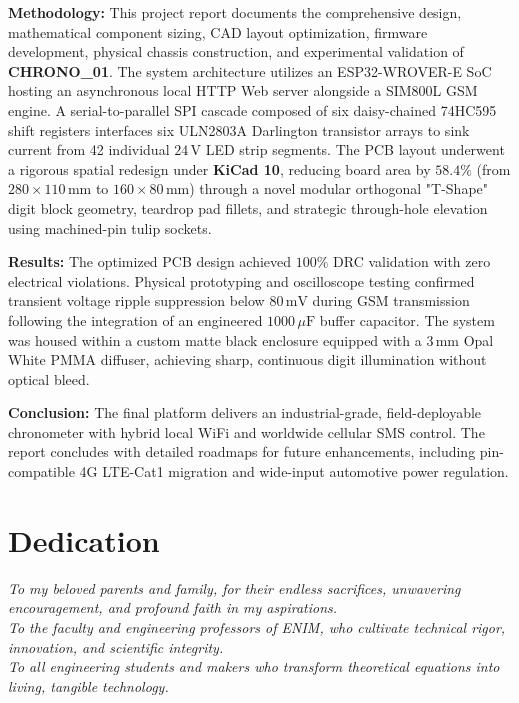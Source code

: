 \documentclass[12pt,a4paper,oneside]{report}
\begin{document}
\vspace{0.4cm}
\noindent\textbf{Methodology:} This project report documents the comprehensive design, mathematical component sizing, CAD layout optimization, firmware development, physical chassis construction, and experimental validation of \textbf{CHRONO\_01}. The system architecture utilizes an ESP32-WROVER-E SoC hosting an asynchronous local HTTP Web server alongside a SIM800L GSM engine. A serial-to-parallel SPI cascade composed of six daisy-chained 74HC595 shift registers interfaces six ULN2803A Darlington transistor arrays to sink current from 42 individual $24\,\text{V}$ LED strip segments. The PCB layout underwent a rigorous spatial redesign under \textbf{KiCad 10}, reducing board area by $58.4\%$ (from $280\times 110\,\text{mm}$ to $160\times 80\,\text{mm}$) through a novel modular orthogonal "T-Shape" digit block geometry, teardrop pad fillets, and strategic through-hole elevation using machined-pin tulip sockets.

\vspace{0.4cm}
\noindent\textbf{Results:} The optimized PCB design achieved $100\%$ DRC validation with zero electrical violations. Physical prototyping and oscilloscope testing confirmed transient voltage ripple suppression below $80\,\text{mV}$ during GSM transmission following the integration of an engineered $1000\,\mu\text{F}$ buffer capacitor. The system was housed within a custom matte black enclosure equipped with a $3\,\text{mm}$ Opal White PMMA diffuser, achieving sharp, continuous digit illumination without optical bleed.

\vspace{0.4cm}
\noindent\textbf{Conclusion:} The final platform delivers an industrial-grade, field-deployable chronometer with hybrid local WiFi and worldwide cellular SMS control. The report concludes with detailed roadmaps for future enhancements, including pin-compatible 4G LTE-Cat1 migration and wide-input automotive power regulation.

\newpage

\chapter*{Dedication}
\begin{center}
    \vspace*{3cm}
    \textit{To my beloved parents and family, for their endless sacrifices, unwavering encouragement, and profound faith in my aspirations.}\\[1cm]
    \textit{To the faculty and engineering professors of ENIM, who cultivate technical rigor, innovation, and scientific integrity.}\\[1cm]
    \textit{To all engineering students and makers who transform theoretical equations into living, tangible technology.}
\end{center}
\end{document}
